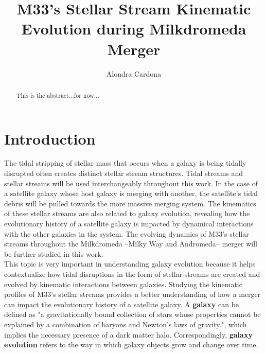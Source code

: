 \documentclass[preprint2]{aastex7}
\begin{document}
\title{M33's Stellar Stream Kinematic Evolution during Milkdromeda Merger}
\author[orcid=0000-0000-0000-0001,sname='Alondra']{Alondra Cardona}

\begin{abstract}

This is the abstract...for now...

\end{abstract}



\section{Introduction} 
The tidal stripping of stellar mass that occurs when a galaxy is being tidally disrupted often creates distinct stellar stream structures. Tidal streams and stellar streams will be used interchangeably throughout this work. In the case of a satellite galaxy whose host galaxy is merging with another, the satellite's tidal debris will be pulled towards the more massive merging system. The kinematics of these stellar streams are also related to galaxy evolution, revealing how the evolutionary history of a satellite galaxy is impacted by dynamical interactions with the other galaxies in the system. The evolving dynamics of M33's stellar streams throughout the Milkdromeda --Milky Way and Andromeda-- merger will be further studied in this work.\\
This topic is very important in understanding galaxy evolution because it helps contextualize how tidal disruptions in the form of stellar streams are created and evolved by kinematic interactions between galaxies. Studying the kinematic profiles of M33's stellar streams provides a better understanding of how a merger can impact the evolutionary history of a satellite galaxy\citep{Johnston_1999}. A \textbf{galaxy} can be defined as "a gravitationally bound collection of stars whose properties cannot be explained by a combination of baryons and Newton’s laws of gravity.", which implies the necessary presence of a dark matter halo\citep{Willman_2012}. Correspondingly, \textbf{galaxy evolution} refers to the way in which galaxy objects grow and change over time.\\
\end{document}
